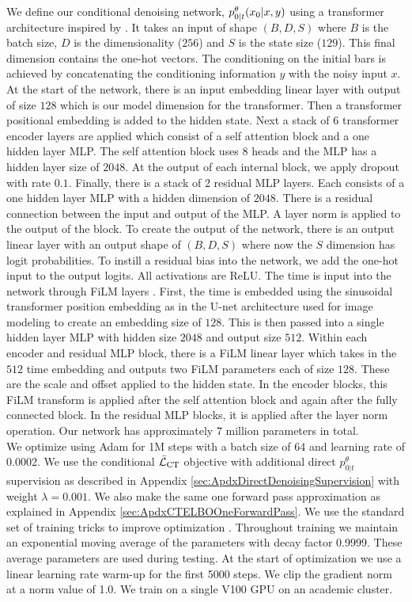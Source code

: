 \documentclass{article}
\begin{document}
We define our conditional denoising network, $\smash{p_{0|t}^\theta}(x_0 | x, y)$ using a transformer architecture inspired by \cite{mittal2021symbolic}. It takes an input of shape $(B, D, S)$ where $B$ is the batch size, $D$ is the dimensionality ($256$) and $S$ is the state size ($129$). This final dimension contains the one-hot vectors. The conditioning on the initial bars is achieved by concatenating the conditioning information $y$ with the noisy input $x$. At the start of the network, there is an input embedding linear layer with output of size $128$ which is our model dimension for the transformer. Then a transformer positional embedding is added to the hidden state. Next a stack of $6$ transformer encoder layers are applied which consist of a self attention block and a one hidden layer MLP. The self attention block uses $8$ heads and the MLP has a hidden layer size of $2048$. At the output of each internal block, we apply dropout with rate $0.1$. Finally, there is a stack of 2 residual MLP layers. Each consists of a one hidden layer MLP with a hidden dimension of $2048$. There is a residual connection between the input and output of the MLP. A layer norm is applied to the output of the block. To create the output of the network, there is an output linear layer with an output shape of $(B, D, S)$ where now the $S$ dimension has logit probabilities. To instill a residual bias into the network, we add the one-hot input to the output logits. All activations are ReLU. The time is input into the network through FiLM layers \cite{perez2018film}. First, the time is embedded using the sinusoidal transformer position embedding as in the U-net architecture used for image modeling to create an embedding size of $128$. This is then passed into a single hidden layer MLP with hidden size $2048$ and output size $512$. Within each encoder and residual MLP block, there is a FiLM linear layer which takes in the $512$ time embedding and outputs two FiLM parameters each of size $128$. These are the scale and offset applied to the hidden state. In the encoder blocks, this FiLM transform is applied after the self attention block and again after the fully connected block. In the residual MLP blocks, it is applied after the layer norm operation. Our network has approximately $7$ million parameters in total.\\

We optimize using Adam for 1M steps with a batch size of 64 and learning rate of 0.0002. We use the conditional $\bar{\mathcal{L}}_{\textup{CT}}$ objective with additional direct $p_{0|t}^\theta$ supervision as described in Appendix \ref{sec:ApdxDirectDenoisingSupervision} with weight $\lambda=0.001$. We also make the same one forward pass approximation as explained in Appendix \ref{sec:ApdxCTELBOOneForwardPass}.  We use the standard set of training tricks to improve optimization \cite{ho2020denoising, song2020score}. Throughout training we maintain an exponential moving average of the parameters with decay factor 0.9999. These average parameters are used during testing. At the start of optimization we use a linear learning rate warm-up for the first 5000 steps. We clip the gradient norm at a norm value of 1.0. We train on a single V100 GPU on an academic cluster.\\
\end{document}
